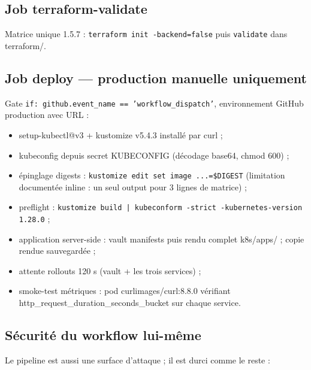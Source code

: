\documentclass[12pt,a4paper,twoside,openright]{report}
\begin{document}
\subsection{Job terraform-validate}
Matrice unique 1.5.7 : \texttt{terraform init -backend=false} puis \texttt{validate} dans terraform/.

\subsection{Job deploy --- production manuelle uniquement}
Gate \texttt{if: github.event\_name == 'workflow\_dispatch'}, environnement GitHub production avec URL :
\begin{itemize}[itemsep=1pt]
  \item setup-kubectl@v3 + kustomize v5.4.3 installé par curl ;
  \item kubeconfig depuis secret KUBECONFIG (décodage base64, chmod 600) ;
  \item épinglage digests : \texttt{kustomize edit set image ...=\$DIGEST} (limitation documentée inline : un seul output pour 3 lignes de matrice) ;
  \item preflight : \texttt{kustomize build | kubeconform -strict -kubernetes-version 1.28.0} ;
  \item application server-side : vault manifests puis rendu complet k8s/apps/ ; copie rendue sauvegardée ;
  \item attente rollouts 120 s (vault + les trois services) ;
  \item smoke-test métriques : pod curlimages/curl:8.8.0 vérifiant http\_request\_duration\_seconds\_bucket sur chaque service.
\end{itemize}

\subsection{Sécurité du workflow lui-même}
Le pipeline est aussi une surface d'attaque ; il est durci comme le reste :
\end{document}
